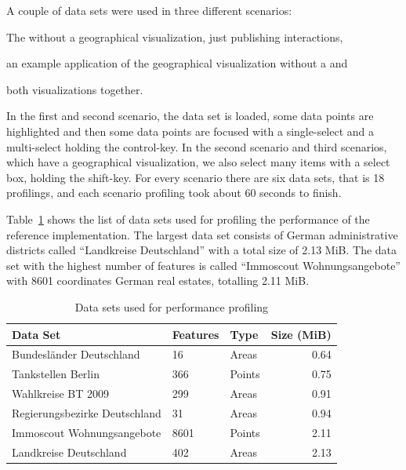 A couple of data sets were used in three different scenarios:
\begin{enumerate*}[label=(\arabic*)]
  \item The \tmap{} without a geographical visualization, just publishing interactions,
  \item an example application of the geographical visualization without a \tmap{} and
  \item both visualizations together.
\end{enumerate*}

In the first and second scenario, the data set is loaded, some data points are highlighted and then some data points are focused with a single-select and a multi-select holding the control-key.
In the second scenario and third scenarios, which have a geographical visualization, we also select many items with a select box, holding the shift-key.
For every scenario there are six data sets, that is 18 profilings, and each scenario profiling took about 60 seconds to finish.

Table~\ref{tab:evaluation:performance:data-sets} shows the list of data sets used for profiling the performance of the reference implementation.
The largest data set consists of German administrative districts called ``Landkreise Deutschland'' with a total size of 2.13 MiB.
The data set with the highest number of features is called ``Immoscout Wohnungsangebote'' with 8601 coordinates German real estates, totalling 2.11 MiB.

\begin{table}[ht]
  \centering
  \begin{tabular}{lllr}
    Data Set & Features & Type & Size (MiB) \\
    \hline
    Bundesländer Deutschland      & 16   & Areas  & 0.64 \\
    Tankstellen Berlin            & 366  & Points & 0.75 \\
    Wahlkreise BT 2009            & 299  & Areas  & 0.91 \\
    Regierungsbezirke Deutschland & 31   & Areas  & 0.94 \\
    Immoscout Wohnungsangebote    & 8601 & Points & 2.11 \\
    Landkreise Deutschland        & 402  & Areas  & 2.13 \\
  \end{tabular}
  \caption{Data sets used for performance profiling}%
  \label{tab:evaluation:performance:data-sets}
\end{table}


